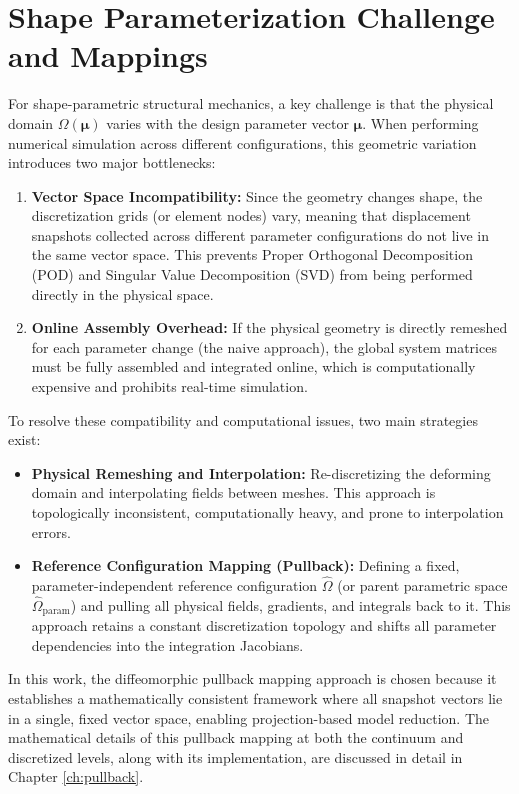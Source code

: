 \section{Shape Parameterization Challenge and Mappings}
For shape-parametric structural mechanics, a key challenge is that the physical domain $\Omega(\boldsymbol{\mu})$ varies with the design parameter vector $\boldsymbol{\mu}$. When performing numerical simulation across different configurations, this geometric variation introduces two major bottlenecks:
\begin{enumerate}
    \item \textbf{Vector Space Incompatibility:} Since the geometry changes shape, the discretization grids (or element nodes) vary, meaning that displacement snapshots collected across different parameter configurations do not live in the same vector space. This prevents Proper Orthogonal Decomposition (POD) and Singular Value Decomposition (SVD) from being performed directly in the physical space.
    \item \textbf{Online Assembly Overhead:} If the physical geometry is directly remeshed for each parameter change (the naive approach), the global system matrices must be fully assembled and integrated online, which is computationally expensive and prohibits real-time simulation.
\end{enumerate}

To resolve these compatibility and computational issues, two main strategies exist:
\begin{itemize}
    \item \textbf{Physical Remeshing and Interpolation:} Re-discretizing the deforming domain and interpolating fields between meshes. This approach is topologically inconsistent, computationally heavy, and prone to interpolation errors.
    \item \textbf{Reference Configuration Mapping (Pullback):} Defining a fixed, parameter-independent reference configuration $\hat{\Omega}$ (or parent parametric space $\hat{\Omega}_{\text{param}}$) and pulling all physical fields, gradients, and integrals back to it. This approach retains a constant discretization topology and shifts all parameter dependencies into the integration Jacobians.
\end{itemize}

In this work, the diffeomorphic pullback mapping approach is chosen because it establishes a mathematically consistent framework where all snapshot vectors lie in a single, fixed vector space, enabling projection-based model reduction. The mathematical details of this pullback mapping at both the continuum and discretized levels, along with its implementation, are discussed in detail in Chapter \ref{ch:pullback}.

